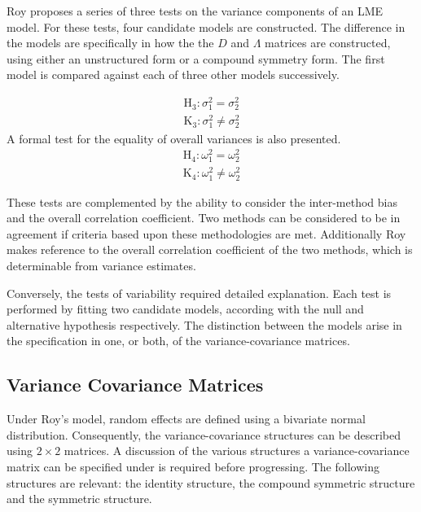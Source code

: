 \documentclass[12pt, a4paper]{report}
\theoremstyle{plain}
\theoremstyle{definition}
\theoremstyle{remark}
\begin{document}
	Roy proposes a series of three tests on the variance components of an LME model. For these tests, four candidate models are constructed. The difference in the models are specifically in how the the $D$ and $\Lambda$ matrices are constructed, using either an unstructured form or a compound symmetry form. The first model is compared against each of three other models successively.
	
	\begin{eqnarray*}
		\operatorname{H_3} : \sigma^2_1 = \sigma^2_2 \\
		\operatorname{K_3} : \sigma^2_1 \neq \sigma^2_2
	\end{eqnarray*}
	A formal test for the equality of overall variances is also presented.
	\begin{eqnarray*}
		\operatorname{H_4} : \omega^2_1 = \omega^2_2 \\
		\operatorname{K_4} : \omega^2_1 \neq \omega^2_2
	\end{eqnarray*}
	
	
	These tests are complemented by the ability to consider the inter-method bias and the overall correlation coefficient.
	Two methods can be considered to be in agreement if criteria based upon these methodologies are met. Additionally Roy makes reference to the overall correlation coefficient of the two methods, which is determinable from variance estimates.
	
	Conversely, the tests of variability required detailed explanation. Each test is performed by fitting two candidate models, according with the null and alternative hypothesis respectively. The distinction between the models arise in the specification in one, or both, of the variance-covariance matrices. %
	
	
	\subsection{Variance Covariance Matrices }
	
	Under Roy's model, random effects are defined using a bivariate normal distribution. Consequently, the variance-covariance structures can be described using $2 \times 2$  matrices. A discussion of the various structures a variance-covariance matrix can be specified under is required before progressing. The following structures are relevant: the identity structure, the compound symmetric structure and the symmetric structure.
	
\end{document}
